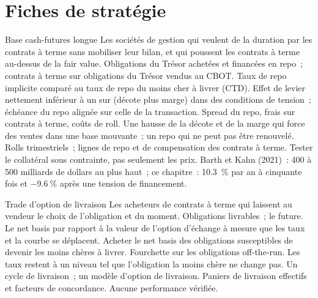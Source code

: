 \section{Fiches de stratégie}

\begin{strategyfile}{Base cash-futures longue}\label{strat:s2:the-bond-futures-basis-trade:long}
 Les sociétés de gestion qui veulent de la duration par les contrats à terme sans mobiliser leur bilan, et qui poussent les contrats à terme
au-dessus de la fair value.
 Obligations du Trésor achetées et financées en repo~; contrats à terme sur obligations du Trésor vendus au CBOT.
 Taux de repo implicite comparé au taux de repo du moins cher à livrer (CTD).
 Effet de levier nettement inférieur à un sur (décote plus marge) dans des conditions de tension~; échéance du repo alignée sur celle de la transaction.
 Spread du repo, frais sur contrats à terme, coûts de roll.
 Une hausse de la décote et de la marge qui force des ventes dans une base mouvante~; un repo qui ne peut pas être renouvelé.
 Rolls trimestriels~; lignes de repo et de compensation des contrats à terme.
 Tester le collatéral sous contrainte, pas seulement les prix.
 Barth et Kahn (2021)~: 400 à 500 milliards de dollars au plus haut~; ce chapitre~: 10.3~\% par an à cinquante fois et $-9.6~\%$ après une tension de financement.
\end{strategyfile}

\begin{strategyfile}{Trade d'option de livraison}\label{strat:s2:the-bond-futures-basis-trade:delivery}
 Les acheteurs de contrats à terme qui laissent au vendeur le choix de l'obligation et du moment.
 Obligations livrables~; le future.
 Le net basis par rapport à la valeur de l'option d'échange à mesure que les taux et la courbe se déplacent.
 Acheter le net basis des obligations susceptibles de devenir les moins chères à livrer.
 Fourchette sur les obligations off-the-run.
 Les taux restent à un niveau tel que l'obligation la moins chère ne change pas.
 Un cycle de livraison~; un modèle d'option de livraison.
 Paniers de livraison effectifs et facteurs de concordance.
 Aucune performance vérifiée.
\end{strategyfile}

